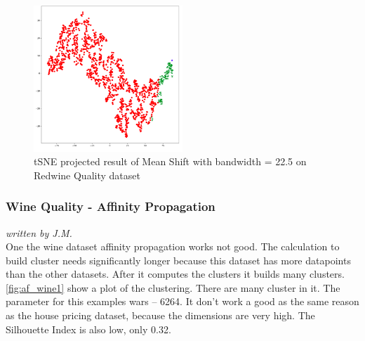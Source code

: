 \begin{figure}[!ht]
\caption{tSNE projected result of Mean Shift with bandwidth = 22.5 on Redwine Quality dataset}
\begin{center}
\includegraphics[width=0.5\textwidth]{images/Meanshift_Wine_22_5.png}
\end{center}
\label{fig:meanshift_wine_22_5}
\end{figure}

\subsubsection{Wine Quality - Affinity Propagation}
\textit{written by J.M.}\\

One the wine dataset affinity propagation works not good. The calculation to build cluster needs significantly longer because this dataset has more datapoints than the other datasets. After it computes the clusters it builds many clusters.  \ref{fig:af_wine1} show a plot of the clustering. There are many cluster in it. The parameter for this examples wars – 6264. It don’t work a good as the same reason as the house pricing dataset, because the dimensions are very high. The Silhouette Index is also low, only 0.32. 

